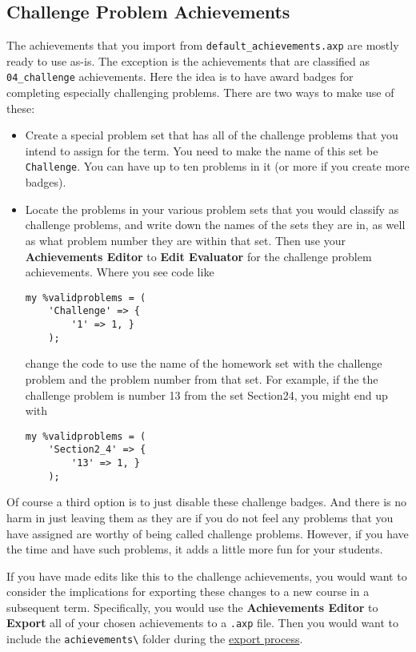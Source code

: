 \documentclass[12pt]{article}
\newcommand{\menu}[1]{\textbf{#1}}
\begin{document}
\subsection{Challenge Problem Achievements}

The achievements that you import from \verb=default_achievements.axp= are mostly ready to use as-is. The exception is the achievements that are classified as \verb=04_challenge= achievements. Here the idea is to have award badges for completing especially challenging problems. There are two ways to make use of these:
\begin{itemize}
\item Create a special problem set that has all of the challenge problems that you intend to assign for the term. You need to make the name of this set be \texttt{Challenge}. You can have up to ten problems in it (or more if you create more badges).
\item Locate the problems in your various problem sets that you would classify as challenge problems, and write down the names of the sets they are in, as well as what problem number they are within that set. Then use your \menu{Achievements Editor} to \menu{Edit Evaluator} for the challenge problem achievements. Where you see code like
\begin{verbatim}
my %validproblems = (
	'Challenge' => {
	    '1' => 1, }
	);
	\end{verbatim}
change the code to use the name of the homework set with the challenge problem and the problem number from that set. For example, if the the challenge problem is number 13 from the set Section2\textunderscore{}4, you might end up with
\begin{verbatim}
my %validproblems = (
	'Section2_4' => {
	    '13' => 1, }
	);
	\end{verbatim}
\end{itemize}

Of course a third option is to just disable these challenge badges. And there is no harm in just leaving them as they are if you do not feel any problems that you have assigned are worthy of being called challenge problems. However, if you have the time and have such problems, it adds a little more fun for your students. 

If you have made edits like this to the challenge achievements, you would want to consider the implications for exporting these changes to a new course in a subsequent term. Specifically, you would use the \menu{Achievements Editor} to \menu{Export} all of your chosen achievements to a \texttt{.axp} file. Then you would want to include the \texttt{achievements\textbackslash} folder during the \hyperref[exp]{export process}.
\end{document}
